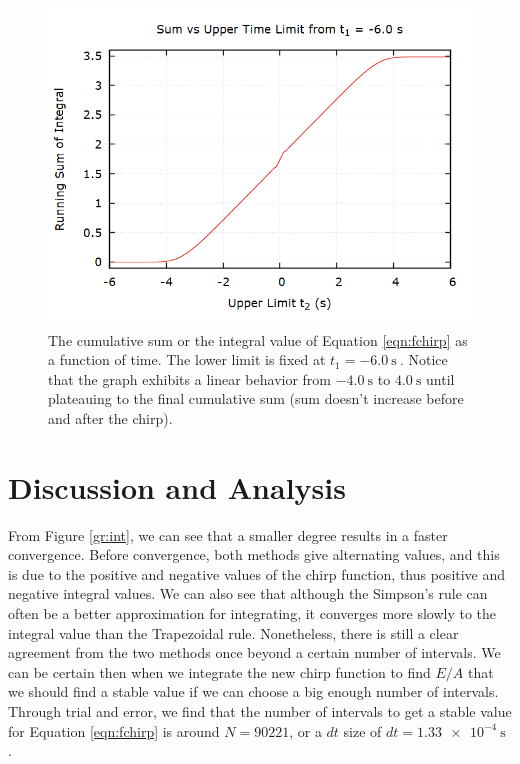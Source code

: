 \documentclass[aps,prl,twocolumn,superscriptaddress]{revtex4-1}
\begin{document}
\begin{figure}[htbp]
  	\begin{center}
 		\includegraphics[scale=0.3]{sum.png} 
  		\caption{The cumulative sum or the integral value of Equation \ref{eqn:fchirp} as a function of time. The lower limit is fixed at $t_1 = \SI{-6.0}{\s}~$. Notice that the graph exhibits a linear behavior from $\SI{-4.0}{\s}$ to $\SI{4.0}{\s}$ until plateauing to the final cumulative sum (sum doesn't increase before and after the chirp).}
  		\label{gr:sum}
 	\end{center}
\end{figure}

\section{Discussion and Analysis}
From Figure \ref{gr:int}, we can see that a smaller degree results in a faster convergence. Before convergence, both methods give alternating values, and this is due to the positive and negative values of the chirp function, thus positive and negative integral values. We can also see that although the Simpson's rule can often be a better approximation for integrating, it converges more slowly to the integral value than the Trapezoidal rule. Nonetheless, there is still a clear agreement from the two methods once beyond a certain number of intervals.  We can be certain then when we integrate the new chirp function to find $E/A$ that we should find a stable value if we can choose a big enough number of intervals. Through trial and error, we find that the number of intervals to get a stable value for Equation \ref{eqn:fchirp} is around $N = 90221$, or a $dt$ size of $dt = \SI{1.33e-4}{\s}~$.
\end{document}
